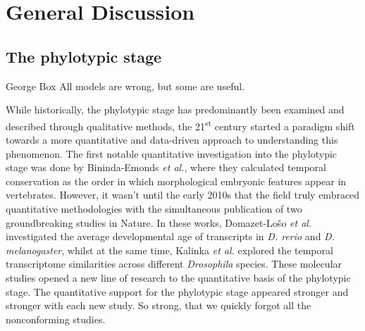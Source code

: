 \chapter{General Discussion}\thumbforchapter
\newpage

\section{The phylotypic stage}

\begin{shadequote}[c]{George Box}
All models are wrong, but some are useful.
\end{shadequote}

While historically, the phylotypic stage has predominantly been examined and described through qualitative methods, the 21\textsuperscript{st} century started a paradigm shift towards a more quantitative and data-driven approach to understanding this phenomenon\cite{Chan2021}. The first notable quantitative investigation into the phylotypic stage was done by Bininda-Emonds \textit{et al.}, where they calculated temporal conservation as the order in which morphological embryonic features appear in vertebrates\cite{OlafRP2003}. However, it wasn't until the early 2010s that the field truly embraced quantitative methodologies with the simultaneous publication of two groundbreaking studies in Nature\cite{Kalinka2010, DomazetLoso2010}. In these works, Domazet-Lošo \textit{et al.} investigated the average developmental age of transcripts in \textit{D. rerio} and \textit{D. melanogaster}, whilst at the same time, Kalinka \textit{et al.} explored the temporal transcriptome similarities across different \textit{Drosophila} species. These molecular studies opened a new line of research to the quantitative basis of the phylotypic stage. The quantitative support for the phylotypic stage appeared stronger and stronger with each new study. So strong, that we quickly forgot all the nonconforming studies.

